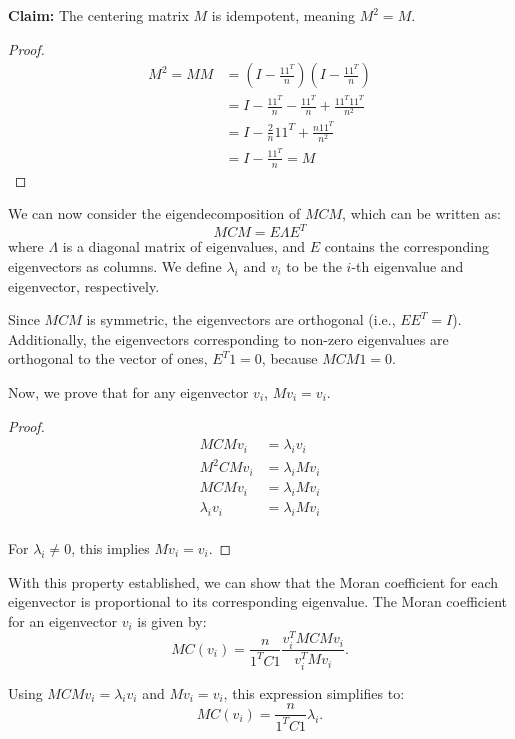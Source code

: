 \documentclass[12pt]{article}
\begin{document}
{\bf Claim:} The centering matrix \( M \) is idempotent, meaning \( M^2 = M \).

\begin{proof}
  \begin{align*}
    M^2 = M M & = \left( I - \frac{1 1^T}{n} \right) \left( I - \frac{1 1^T}{n} \right) \\
              & = I - \frac{1 1^T}{n} - \frac{1 1^T}{n} + \frac{1 1^T 1 1^T}{n^2} \\
              & = I - \frac{2}{n} 1 1^T + \frac{n 1 1^T}{n^2} \\
              & = I - \frac{1 1^T}{n} = M
  \end{align*}
\end{proof}

We can now consider the eigendecomposition of \( M C M \), which can be written as:
\[
  M C M = E \Lambda E^{T}
\]
where \( \Lambda \) is a diagonal matrix of eigenvalues, and \( E \) contains the corresponding eigenvectors as columns. We define \( \lambda_i \) and \( v_i \) to be the \( i \)-th eigenvalue and eigenvector, respectively.

Since \( M C M \) is symmetric, the eigenvectors are orthogonal (i.e., \( E E^T = I \)). Additionally, the eigenvectors corresponding to non-zero eigenvalues are orthogonal to the vector of ones, \( E^T 1 = 0 \), because \( M C M 1 = 0 \).

Now, we prove that for any eigenvector \( v_i \), \( M v_i = v_i \).
\begin{proof}
  \begin{align*}
    M C M v_i & = \lambda_i v_i \\
    M^2 C M v_i & = \lambda_i M v_i \\
    M C M v_i & = \lambda_i M v_i \\
    \lambda_i v_i & = \lambda_i M v_i \\
  \end{align*}

  For \( \lambda_i \neq 0 \), this implies \( M v_i = v_i \).
\end{proof}

With this property established, we can show that the Moran coefficient for each eigenvector is proportional to its corresponding eigenvalue. The Moran coefficient for an eigenvector \( v_i \) is given by:
\[
  M C (v_i)=\frac{n}{1^T C 1} \frac{v_i^T M C M v_i}{v_i^T M v_i}.
\]

Using \( M C M v_i = \lambda_i v_i \) and \( M v_i = v_i \), this expression simplifies to:
\[
  M C (v_i)=\frac{n}{1^T C 1} \lambda_i.
\]
\end{document}
